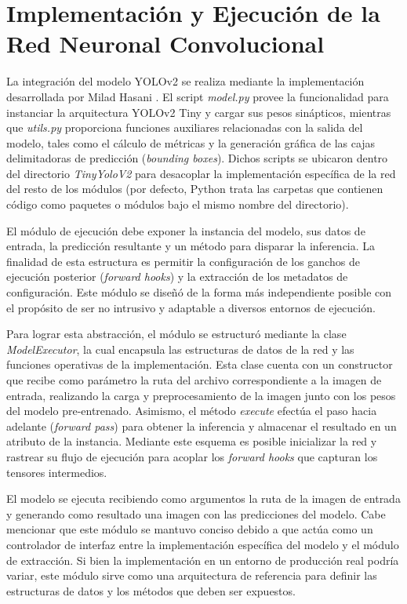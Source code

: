 \section{Implementación y Ejecución de la Red Neuronal Convolucional}
La integración del modelo YOLOv2 se realiza mediante la implementación desarrollada por Milad 
Hasani \parencite{yolov2_implementation}. El script \textit{model.py} provee la funcionalidad 
para instanciar la arquitectura YOLOv2 Tiny y cargar sus pesos sinápticos, mientras que 
\textit{utils.py} proporciona funciones auxiliares relacionadas con la salida del modelo, 
tales como el cálculo de métricas y la generación gráfica de las cajas delimitadoras de 
predicción (\textit{bounding boxes}). Dichos scripts se ubicaron dentro del directorio 
\textit{TinyYoloV2} para desacoplar la implementación específica de la red del resto de 
los módulos (por defecto, Python trata las carpetas que contienen código como paquetes o 
módulos bajo el mismo nombre del directorio).
\medskip

El módulo de ejecución debe exponer la instancia del modelo, sus datos de entrada, la predicción 
resultante y un método para disparar la inferencia. La finalidad de esta estructura es permitir 
la configuración de los ganchos de ejecución posterior (\textit{forward hooks}) y la extracción 
de los metadatos de configuración. Este módulo se diseñó de la forma más independiente posible 
con el propósito de ser no intrusivo y adaptable a diversos entornos de ejecución.
\medskip

Para lograr esta abstracción, el módulo se estructuró mediante la clase \textit{ModelExecutor}, 
la cual encapsula las estructuras de datos de la red y las funciones operativas de la 
implementación. Esta clase cuenta con un constructor que recibe como parámetro la ruta del archivo 
correspondiente a la imagen de entrada, realizando la carga y preprocesamiento de la imagen junto 
con los pesos del modelo pre-entrenado. Asimismo, el método \textit{execute} efectúa el paso hacia 
adelante (\textit{forward pass}) para obtener la inferencia y almacenar el resultado en un 
atributo de la instancia. Mediante este esquema es posible inicializar la red y rastrear su 
flujo de ejecución para acoplar los \textit{forward hooks} que capturan los tensores intermedios.
\medskip

El modelo se ejecuta recibiendo 
como argumentos la ruta de la imagen de entrada y generando como resultado una 
imagen con las predicciones del modelo. Cabe mencionar que este módulo se mantuvo conciso debido 
a que actúa como un controlador de interfaz entre la implementación específica del modelo y el 
módulo de extracción. Si bien la implementación en un entorno de producción real podría variar, 
este módulo sirve como una arquitectura de referencia para definir las estructuras de datos y 
los métodos que deben ser expuestos.
